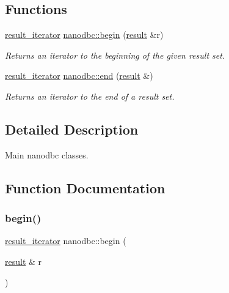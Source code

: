\subsection*{Functions}
\begin{DoxyCompactItemize}
\item 
\mbox{\hyperlink{classnanodbc_1_1result__iterator}{result\+\_\+iterator}} \mbox{\hyperlink{group__mainc_gac6e8e0e4c603c1bbfc0c7db3a58919f0}{nanodbc\+::begin}} (\mbox{\hyperlink{classnanodbc_1_1result}{result}} \&r)
\begin{DoxyCompactList}\small\item\em Returns an iterator to the beginning of the given result set. \end{DoxyCompactList}\item 
\mbox{\hyperlink{classnanodbc_1_1result__iterator}{result\+\_\+iterator}} \mbox{\hyperlink{group__mainc_ga91df79a3401b5afd4ec109101737b05b}{nanodbc\+::end}} (\mbox{\hyperlink{classnanodbc_1_1result}{result}} \&)
\begin{DoxyCompactList}\small\item\em Returns an iterator to the end of a result set. \end{DoxyCompactList}\end{DoxyCompactItemize}


\subsection{Detailed Description}
Main nanodbc classes. 



\subsection{Function Documentation}
\mbox{\label{group__mainc_gac6e8e0e4c603c1bbfc0c7db3a58919f0}} 
\subsubsection{\texorpdfstring{begin()}{begin()}}
{\footnotesize\ttfamily \mbox{\hyperlink{classnanodbc_1_1result__iterator}{result\+\_\+iterator}} nanodbc\+::begin (\begin{DoxyParamCaption}\item[{\mbox{\hyperlink{classnanodbc_1_1result}{result}} \&}]{r }\end{DoxyParamCaption})\hspace{0.3cm}{\ttfamily [inline]}}



